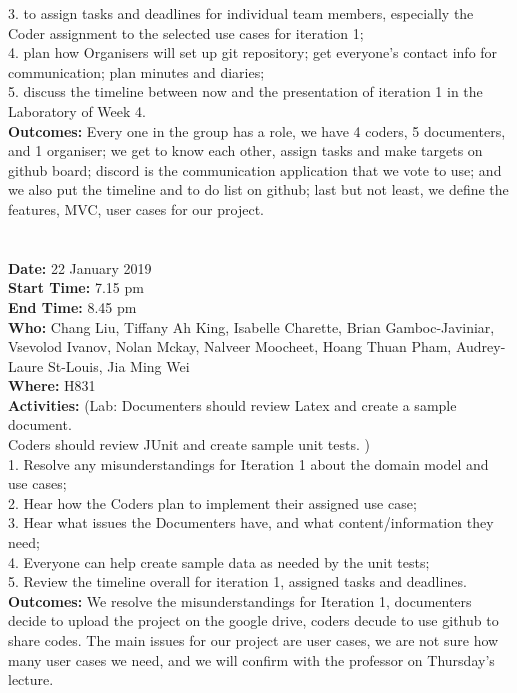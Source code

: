 \documentclass[12pt]{article}
\begin{document}
3. to assign tasks and deadlines for individual team members, especially the Coder assignment to the selected use cases for iteration 1;\\
4. plan how Organisers will set up git repository; get everyone’s contact info for communication; plan minutes and diaries;\\
5. discuss the timeline between now and the presentation of iteration 1 in the Laboratory of Week 4.\\
{\bf Outcomes:} Every one in the group has a role, we have 4 coders, 5 documenters, and 1 organiser; we get to know each other, assign tasks and make targets on github board; discord is the communication application that we vote to use; and we also put the timeline and to do list on github; last but not least, we define the features, MVC, user cases for our project.\\
\\\\
{\bf Date:} 22 January 2019\\
{\bf Start Time:} 7.15 pm\\
{\bf End Time:} 8.45 pm \\
{\bf Who:} Chang Liu, Tiffany Ah King, Isabelle Charette, Brian Gamboc-Javiniar, Vsevolod Ivanov, Nolan Mckay, Nalveer Moocheet, Hoang Thuan Pham, Audrey-Laure St-Louis, Jia Ming Wei\\
{\bf Where:} H831 \\
{\bf Activities:} (Lab: Documenters should review Latex and create a sample document.\\
Coders should review JUnit and create sample unit tests. )\\
1. Resolve any misunderstandings for Iteration 1 about the domain model and use cases;\\
2. Hear how the Coders plan to implement their assigned use case;\\
3. Hear what issues the Documenters have, and what content/information they need; \\
4. Everyone can help create sample data as needed by the unit tests; \\
5. Review the timeline overall for iteration 1, assigned tasks and deadlines.\\
{\bf Outcomes:} We resolve the misunderstandings for Iteration 1, documenters decide to upload the project on the google drive, coders decude to use github to share codes. The main issues for our project are user cases, we are not sure how many user cases we need, and we will confirm with the professor on Thursday's lecture.\\\\
\end{document}
